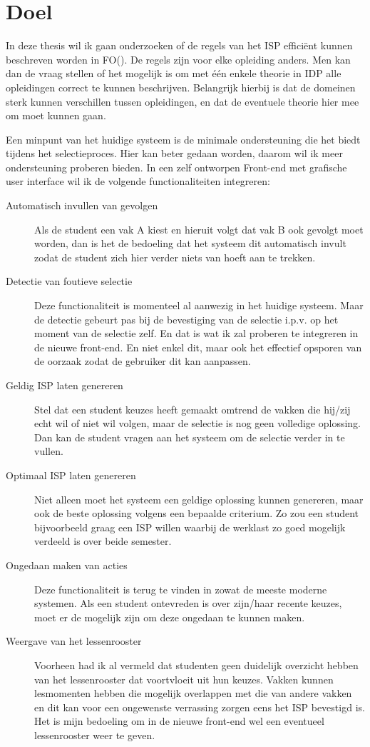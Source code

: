 \section{Doel}
In deze thesis wil ik gaan onderzoeken of de regels van het ISP effici\"{e}nt kunnen beschreven worden in FO(\textperiodcentered). De regels zijn voor elke opleiding anders. Men kan dan de vraag stellen of het mogelijk is om met \'{e}\'{e}n enkele theorie in IDP alle opleidingen correct te kunnen beschrijven. Belangrijk hierbij is dat de domeinen sterk kunnen verschillen tussen opleidingen, en dat de eventuele theorie hier mee om moet kunnen gaan. 

Een minpunt van het huidige systeem is de minimale ondersteuning die het biedt tijdens het selectieproces. Hier kan beter gedaan worden, daarom wil ik meer ondersteuning proberen bieden. In een zelf ontworpen Front-end met grafische user interface wil ik de volgende functionaliteiten integreren:
\begin{description}
\item[Automatisch invullen van gevolgen] Als de student een vak A kiest en hieruit volgt dat vak B ook gevolgt moet worden, dan is het de bedoeling dat het systeem dit automatisch invult zodat de student zich hier verder niets van hoeft aan te trekken. 
\item[Detectie van foutieve selectie] Deze functionaliteit is momenteel al aanwezig in het huidige systeem. Maar de detectie gebeurt pas bij de bevestiging van de selectie i.p.v. op het moment van de selectie zelf. En dat is wat ik zal proberen te integreren in de nieuwe front-end. En niet enkel dit, maar ook het effectief opsporen van de oorzaak zodat de gebruiker dit kan aanpassen.
\item[Geldig ISP laten genereren] Stel dat een student keuzes heeft gemaakt omtrend de vakken die hij/zij echt wil of niet wil volgen, maar de selectie is nog geen volledige oplossing. Dan kan de student vragen aan het systeem om de selectie verder in te vullen.
\item[Optimaal ISP laten genereren] Niet alleen moet het systeem een geldige oplossing kunnen genereren, maar ook de beste oplossing volgens een bepaalde criterium. Zo zou een student bijvoorbeeld graag een ISP willen waarbij de werklast zo goed mogelijk verdeeld is over beide semester. 
\item[Ongedaan maken van acties] Deze functionaliteit is terug te vinden in zowat de meeste moderne systemen. Als een student ontevreden is over zijn/haar recente keuzes, moet er de mogelijk zijn om deze ongedaan te kunnen maken. 
\item[Weergave van het lessenrooster] Voorheen had ik al vermeld dat studenten geen duidelijk overzicht hebben van het lessenrooster dat voortvloeit uit hun keuzes. Vakken kunnen lesmomenten hebben die mogelijk overlappen met die van andere vakken en dit kan voor een ongewenste verrassing zorgen eens het ISP bevestigd is. Het is mijn bedoeling om in de nieuwe front-end wel een eventueel lessenrooster weer te geven.
\end{description}
